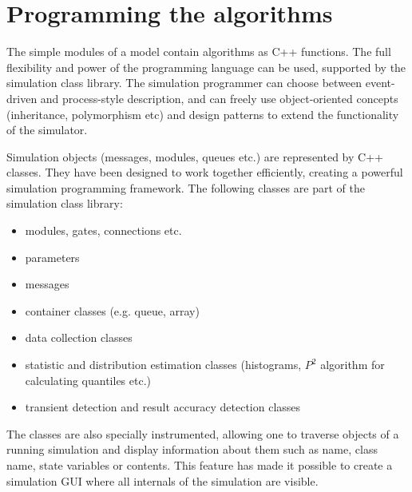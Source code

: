 \section{Programming the algorithms}

The simple modules of a model contain algorithms
as C++ functions.
The full flexibility and power of the programming language can
be used, supported by the {\opp} simulation class library.
The simulation programmer can choose between event-driven and process-style
description, and can freely use object-oriented concepts
(inheritance, polymorphism etc) and design patterns to extend the
functionality of the simulator.

Simulation objects (messages, modules, queues etc.) are represented
by C++ classes. They have been designed to work together efficiently,
creating a powerful simulation programming framework.
The following classes are part of the simulation class library:

\begin{itemize}
  \item{modules, gates, connections etc.}
  \item{parameters}
  \item{messages}
  \item{container classes (e.g. queue, array)}
  \item{data collection classes}
  \item{statistic and distribution estimation classes (histograms, $P^2$
  algorithm for calculating quantiles etc.)}
  \item{transient detection and result accuracy detection classes}
\end{itemize}

The classes are also specially instrumented, allowing one
to traverse objects of a running simulation and display information
about them such as name, class name, state variables or contents.
This feature has made it possible to create a simulation GUI where
all internals of the simulation are visible.


